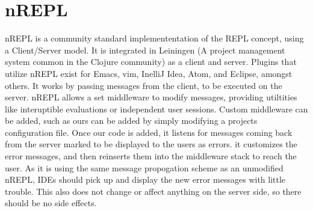 \documentclass[12pt]{article}
\begin{document}
\section{nREPL}
nREPL is a community standard implemententation of the REPL concept,
 using a Client/Server model. It is integrated in Leiningen
  (A project management system common in the Clojure community) as a client and server.
 Plugins that utilize nREPL exist for Emacs, vim, InelliJ Idea, Atom, and Eclipse, amongst others.
It works by passing messages from the client, to be executed on the server.
nREPL allows a set middleware to modify messages, providing utiltities
like interuptible evaluations or independent user sessions.
Custom middleware can be added, such as ours can be added by simply
modifying a projects configuration file. Once our code is added,
it listens for messages coming back from the server
marked to be displayed to the users as errors.
it customizes the error messages, and then reinserts them into the middleware stack
to reach the user. As it is using the same message propogation scheme as an unmodified nREPL,
IDEs should pick up and display the new error messages with little trouble.
This also does not change or affect anything on the server side, so there should
be no side effects.

\end{document}
